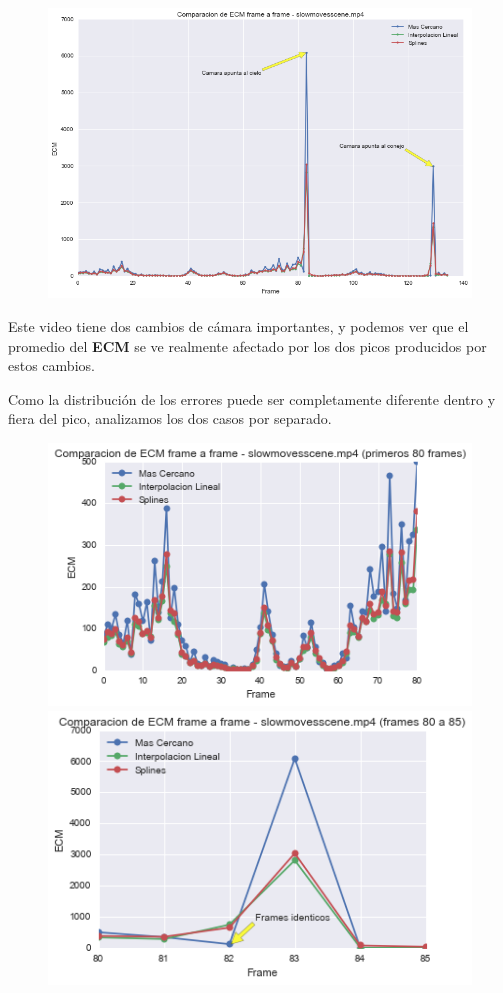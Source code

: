 \begin{figure}[H]
\centering
\includegraphics[width=.95\textwidth]{graficos/ecm_frame_slowmovescene.png}
\end{figure}

Este video tiene dos cambios de c\'amara importantes, y podemos ver que el
promedio del \textbf{ECM} se ve realmente afectado por los dos picos producidos
por estos cambios.

Como la distribuci\'on de los errores puede ser completamente diferente dentro y
fiera del pico, analizamos los dos casos por separado.

\begin{figure}[H]
\centering
\includegraphics[width=.49\textwidth]{graficos/ecm_frame_slowmovescene_0_80.png}
\includegraphics[width=.49\textwidth]{graficos/ecm_frame_slowmovescene_80_85.png}
\end{figure}

